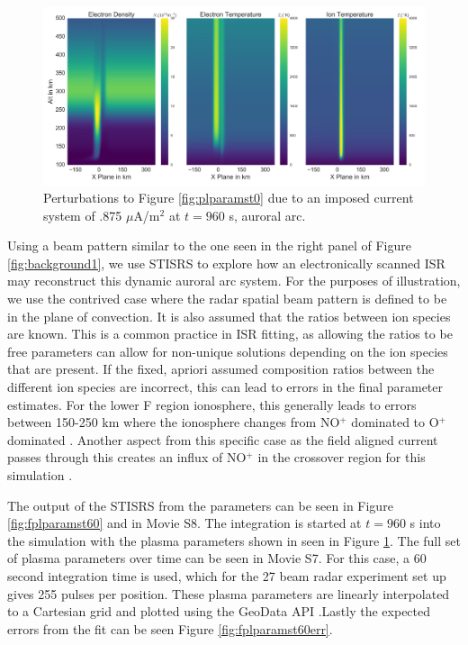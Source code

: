 \documentclass[draft,ras]{agutex}
\begin{document}
\begin{article}
\begin{figure}[!t]
\centering
\includegraphics[width=6in]{0960_15_int}
\caption{Perturbations to Figure \ref{fig:plparamst0} due to an imposed current system of .875 $\mu$A/m$^2$ at $t=960$ s, auroral arc.}
\label{fig:plparamst60}
\end{figure}

Using a beam pattern similar to the one seen in the right panel of Figure \ref{fig:background1}, we use STISRS to explore how an electronically scanned ISR may reconstruct this dynamic auroral arc system.  For the purposes of illustration, we use the contrived case where the radar spatial beam pattern is defined to be in the plane of convection.  It is also assumed that the ratios between ion species are known. This is a common practice in ISR fitting, as allowing the ratios to be free parameters can allow for non-unique solutions depending on the ion species that are present. If the fixed, apriori assumed composition ratios between the different ion species are incorrect, this can lead to errors in the final parameter estimates. For the lower F region ionosphere, this generally leads to errors between 150-250 km where the ionosphere changes from NO$^+$ dominated to O$^+$ dominated \citep{Zettergren:2011ej, Blelly:2010gf}. Another aspect from this specific case as the field aligned current passes through this creates an influx of  NO$^+$ in the crossover region for this simulation \citet{Perry:2015jf}.

The output of the STISRS from the parameters can be seen in Figure \ref{fig:fplparamst60} and in Movie S8. The integration is started at $t=960$ s into the simulation with the plasma parameters shown in seen in Figure \ref{fig:plparamst60}. The full set of plasma parameters over time can be seen in Movie S7. For this case, a 60 second integration time is used, which for the 27 beam radar experiment set up gives 255 pulses per position. These plasma parameters are linearly interpolated to a Cartesian grid and plotted using the GeoData API \cite{john_swoboda_2016_154533}.Lastly the expected errors from the fit can be seen Figure \ref{fig:fplparamst60err}.


\end{article}
\end{document}
